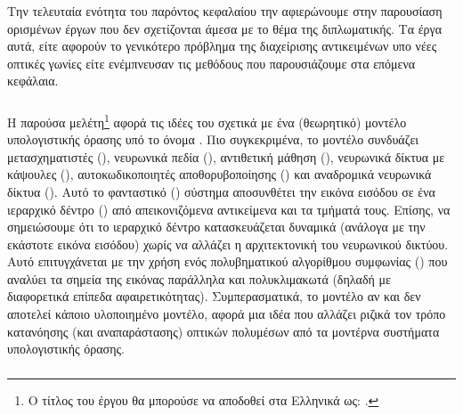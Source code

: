 Την τελευταία ενότητα του παρόντος κεφαλαίου την αφιερώνουμε στην παρουσίαση ορισμένων έργων που δεν σχετίζονται άμεσα με το θέμα της διπλωματικής. Τα έργα αυτά, είτε αφορούν το γενικότερο πρόβλημα της διαχείρισης αντικειμένων υπο νέες οπτικές γωνίες είτε ενέμπνευσαν τις μεθόδους που παρουσιάζουμε στα επόμενα κεφάλαια.

\subsubsection{}

Η παρούσα μελέτη\footnote{Ο τίτλος του έργου θα μπορούσε να αποδοθεί στα Ελληνικά ως: .} \cite{hinton2021represent_GLOM} αφορά τις ιδέες του  σχετικά με ένα (θεωρητικό) μοντέλο υπολογιστικής όρασης υπό το όνομα . Πιο συγκεκριμένα, το μοντέλο συνδυάζει μετασχηματιστές (), νευρωνικά πεδία (), αντιθετική μάθηση (), νευρωνικά δίκτυα με κάψουλες (), αυτοκωδικοποιητές αποθορυβοποίησης () και αναδρομικά νευρωνικά δίκτυα (). Αυτό το φανταστικό () σύστημα αποσυνθέτει την εικόνα εισόδου σε ένα ιεραρχικό δέντρο () από απεικονιζόμενα αντικείμενα και τα τμήματά τους. Επίσης, να σημειώσουμε ότι το ιεραρχικό δέντρο κατασκευάζεται δυναμικά (ανάλογα με την εκάστοτε εικόνα εισόδου) χωρίς να αλλάζει η αρχιτεκτονική του νευρωνικού δικτύου. Αυτό επιτυγχάνεται με την χρήση ενός πολυβηματικού αλγορίθμου συμφωνίας () που αναλύει τα σημεία της εικόνας παράλληλα και πολυκλιμακωτά (δηλαδή με διαφορετικά επίπεδα αφαιρετικότητας). Συμπερασματικά, το μοντέλο  αν και δεν αποτελεί κάποιο υλοποιημένο μοντέλο, αφορά μια ιδέα που αλλάζει ριζικά τον τρόπο κατανόησης (και αναπαράστασης) οπτικών πολυμέσων από τα μοντέρνα συστήματα υπολογιστικής όρασης. 


\subsubsection{}

